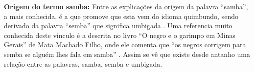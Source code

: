 
\begin{tcbinformation}
\textbf{Origem do termo samba:}
Entre as explicações da origem da palavra ``samba'', 
a mais conhecida, é a que promove que esta vem do idioma quimbundo, 
sendo derivado da palavra ``semba''  que significa umbigada \cite[pp. 32]{jornalsambaderoda2} \cite[pp. 47]{diniz2008almanaque} \cite[pp. 50]{da2015historia}.
Uma referencia muito conhecida deste vinculo é a descrita no livro ``O negro e o garimpo em Minas Gerais''
de Mata Machado Filho, onde ele comenta que ``os negros corrigem para semba se 
alguém lhes fala em samba'' \cite[pp. 85]{sandroni2001feitico}. Assim se vê que existe
desde antanho uma relação entre as palavras, 
samba, semba e umbigada.
\end{tcbinformation}

